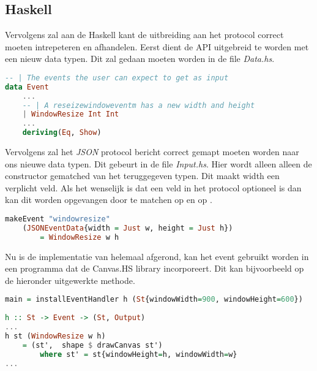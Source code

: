 \subsection{Haskell}
Vervolgens zal aan de Haskell kant de uitbreiding aan het protocol correct moeten intrepeteren en afhandelen. Eerst dient de API uitgebreid te worden met een nieuw data typen. Dit zal gedaan moeten worden in de file \emph{Data.hs}.
\begin{lstlisting}[language=Haskell]
-- | The events the user can expect to get as input
data Event
    ...
    -- | A reseizewindoweventm has a new width and height
    | WindowResize Int Int
    ...
    deriving(Eq, Show)
\end{lstlisting}
Vervolgens zal het \emph{JSON} protocol bericht correct gemapt moeten worden naar ons nieuwe data typen. Dit gebeurt in de file \emph{Input.hs}. Hier wordt alleen alleen de  constructor gematched van het teruggegeven  typen. Dit maakt width een verplicht veld. Als het wenselijk is dat een veld in het protocol optioneel is dan kan dit worden opgevangen door te matchen op  en op .
\begin{lstlisting}[language=Haskell]
makeEvent "windowresize"
    (JSONEventData{width = Just w, height = Just h})
        = WindowResize w h
\end{lstlisting}
Nu is de implementatie van  helemaal afgerond, kan het event gebruikt worden in een programma dat de Canvas.HS library incorporeert. Dit kan bijvoorbeeld op de hieronder uitgewerkte methode.
\begin{lstlisting}[language=Haskell]
main = installEventHandler h (St{windowWidth=900, windowHeight=600})
 
h :: St -> Event -> (St, Output)
...
h st (WindowResize w h)
    = (st',  shape $ drawCanvas st')
        where st' = st{windowHeight=h, windowWidth=w}
...
\end{lstlisting}


